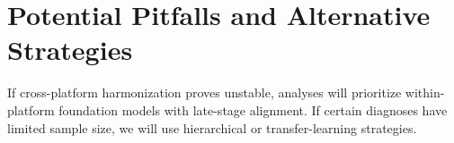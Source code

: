 \section{Potential Pitfalls and Alternative Strategies}

If cross-platform harmonization proves unstable, analyses will
prioritize within-platform foundation models with late-stage alignment.
If certain diagnoses have limited sample size, we will use hierarchical
or transfer-learning strategies.
